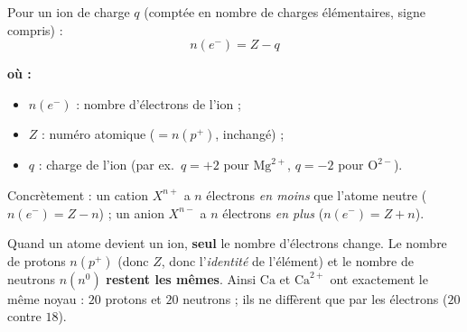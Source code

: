 \documentclass[11pt,a4paper]{article}
\newenvironment{ou}{%
  \par\smallskip\noindent\textbf{où :}\nopagebreak
  \begin{itemize}[leftmargin=1.8em,topsep=2pt,itemsep=1.5pt,parsep=0pt]}%
  {\end{itemize}}
\newcommand{\pp}{p^{+}}      %
\newcommand{\ee}{e^{-}}      %
\newcommand{\nz}{n^{0}}      %
\newcommand{\np}{n(\pp)}     %
\renewcommand{\ne}{n(\ee)}   %
\newcommand{\nnn}{n(\nz)}    %
\begin{document}
\begin{formule}
Pour un ion de charge $q$ (comptée en nombre de charges élémentaires, signe compris) :
\[ \boxed{\ \ne = Z - q\ } \]
\begin{ou}
  \item $\ne$ : nombre d'électrons de l'ion ;
  \item $Z$ : numéro atomique ($=\np$, inchangé) ;
  \item $q$ : charge de l'ion (par ex.\ $q = +2$ pour $\mathrm{Mg}^{2+}$, $q = -2$ pour $\mathrm{O}^{2-}$).
\end{ou}
Concrètement : un cation $X^{n+}$ a $n$ électrons \emph{en moins} que l'atome neutre
($\ne = Z - n$) ; un anion $X^{n-}$ a $n$ électrons \emph{en plus} ($\ne = Z + n$).
\end{formule}

\begin{attention}
Quand un atome devient un ion, \textbf{seul} le nombre d'électrons change. Le nombre de protons $\np$
(donc $Z$, donc l'\emph{identité} de l'élément) et le nombre de neutrons $\nnn$ \textbf{restent les
mêmes}. Ainsi $\mathrm{Ca}$ et $\mathrm{Ca}^{2+}$ ont exactement le même noyau : $20$ protons et $20$
neutrons ; ils ne diffèrent que par les électrons ($20$ contre $18$).
\end{attention}
\end{document}
